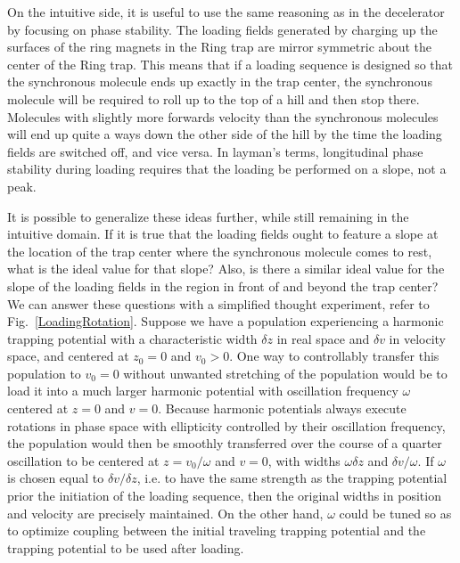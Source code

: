 \documentclass[defaultstyle,11pt]{thesis}
\begin{document}
On the intuitive side, it is useful to use the same reasoning as in the decelerator by focusing on phase stability.
The loading fields generated by charging up the surfaces of the ring magnets in the Ring trap are mirror symmetric about the center of the Ring trap.
This means that if a loading sequence is designed so that the synchronous molecule ends up exactly in the trap center, the synchronous molecule will be required to roll up to the top of a hill and then stop there. 
Molecules with slightly more forwards velocity than the synchronous molecules will end up quite a ways down the other side of the hill by the time the loading fields are switched off, and vice versa.
In layman's terms, longitudinal phase stability during loading requires that the loading be performed on a slope, not a peak.

It is possible to generalize these ideas further, while still remaining in the intuitive domain.
If it is true that the loading fields ought to feature a slope at the location of the trap center where the synchronous molecule comes to rest, what is the ideal value for that slope?
Also, is there a similar ideal value for the slope of the loading fields in the region in front of and beyond the trap center?
We can answer these questions with a simplified thought experiment, refer to Fig.~\ref{LoadingRotation}.
Suppose we have a population experiencing a harmonic trapping potential with a characteristic width $\delta z$ in real space and $\delta v$ in velocity space, and centered at $z_0=0$ and $v_0 > 0$.
One way to controllably transfer this population to $v_0=0$ without unwanted stretching of the population would be to load it into a much larger harmonic potential with oscillation frequency $\omega$ centered at $z=0$ and $v=0$.
Because harmonic potentials always execute rotations in phase space with ellipticity controlled by their oscillation frequency, the population would then be smoothly transferred over the course of a quarter oscillation to be centered at $z = v_0/\omega$ and $v=0$, with widths $\omega\delta z$ and $\delta v/\omega$.
If $\omega$ is chosen equal to $\delta v/\delta z$, i.e. to have the same strength as the trapping potential prior the initiation of the loading sequence, then the original widths in position and velocity are precisely maintained.
On the other hand, $\omega$ could be tuned so as to optimize coupling between the initial traveling trapping potential and the trapping potential to be used after loading.
\end{document}

